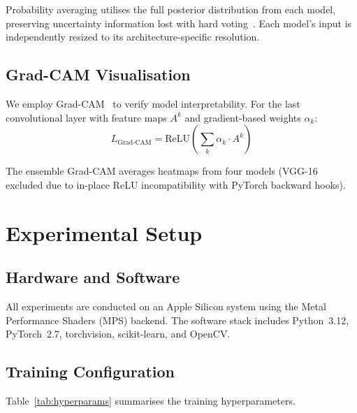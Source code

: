 \documentclass[conference]{IEEEtran}
\begin{document}
Probability averaging utilises the full posterior distribution from each model, preserving uncertainty information lost with hard voting~\cite{kittler1998combining}. Each model's input is independently resized to its architecture-specific resolution.

\subsection{Grad-CAM Visualisation}

We employ Grad-CAM~\cite{selvaraju2017gradcam} to verify model interpretability. For the last convolutional layer with feature maps $A^k$ and gradient-based weights $\alpha_k$:
\begin{equation}
L_{\text{Grad-CAM}} = \text{ReLU}\!\left(\sum_k \alpha_k \cdot A^k\right)
\end{equation}

The ensemble Grad-CAM averages heatmaps from four models (VGG-16 excluded due to in-place ReLU incompatibility with PyTorch backward hooks).

\section{Experimental Setup}

\subsection{Hardware and Software}

All experiments are conducted on an Apple Silicon system using the Metal Performance Shaders (MPS) backend. The software stack includes Python~3.12, PyTorch~2.7, torchvision, scikit-learn, and OpenCV.

\subsection{Training Configuration}

Table~\ref{tab:hyperparams} summarises the training hyperparameters.
\end{document}

